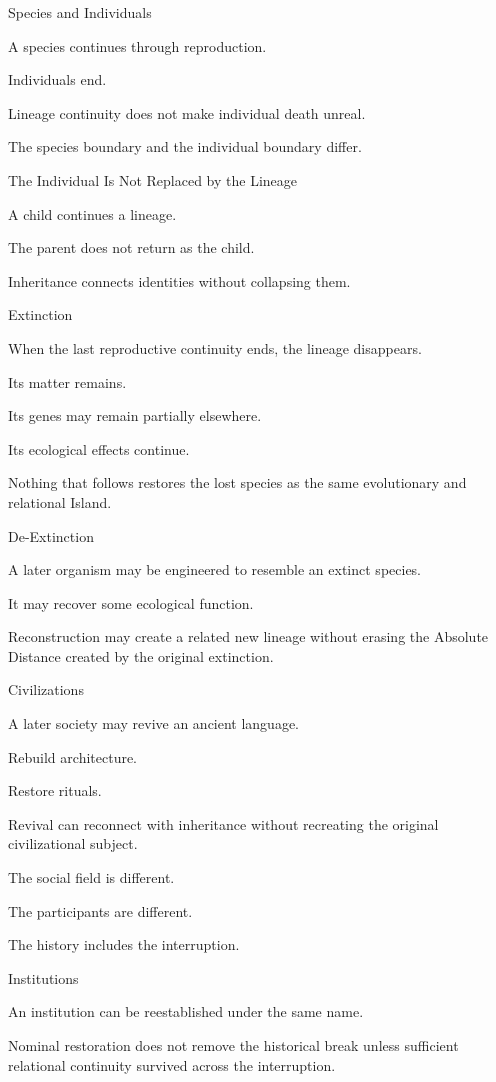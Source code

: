 Species and Individuals

A species continues through reproduction.

Individuals end.

Lineage continuity does not make individual death unreal.

The species boundary and the individual boundary differ.

The Individual Is Not Replaced by the Lineage

A child continues a lineage.

The parent does not return as the child.

Inheritance connects identities without collapsing them.

Extinction

When the last reproductive continuity ends, the lineage disappears.

Its matter remains.

Its genes may remain partially elsewhere.

Its ecological effects continue.

Nothing that follows restores the lost species as the same evolutionary and relational Island.

De-Extinction

A later organism may be engineered to resemble an extinct species.

It may recover some ecological function.

Reconstruction may create a related new lineage without erasing the Absolute Distance created by the original extinction.

Civilizations

A later society may revive an ancient language.

Rebuild architecture.

Restore rituals.

Revival can reconnect with inheritance without recreating the original civilizational subject.

The social field is different.

The participants are different.

The history includes the interruption.

Institutions

An institution can be reestablished under the same name.

Nominal restoration does not remove the historical break unless sufficient relational continuity survived across the interruption.

